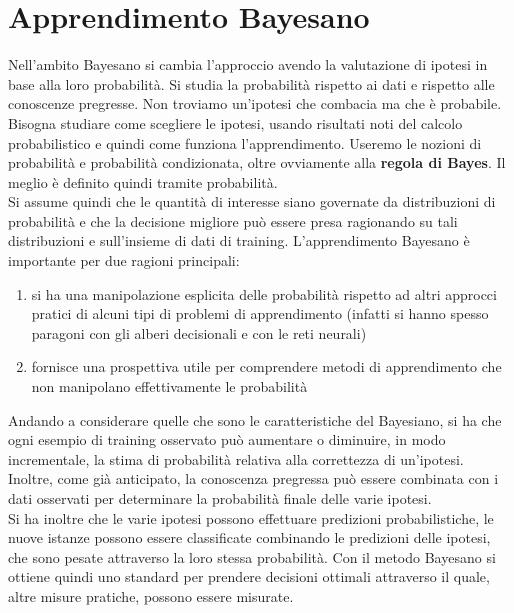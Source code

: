 \section{Apprendimento Bayesano}
Nell'ambito Bayesano si cambia l'approccio avendo la valutazione di ipotesi in base alla loro probabilità. Si studia la probabilità rispetto ai dati e rispetto
alle conoscenze pregresse. Non troviamo un'ipotesi che combacia ma che è probabile.\\

Bisogna studiare come scegliere le ipotesi, usando risultati noti del calcolo probabilistico e quindi come funziona l'apprendimento. Useremo le nozioni di probabilità e probabilità condizionata, oltre ovviamente alla \textbf{regola di Bayes}. Il meglio è definito quindi tramite probabilità.\\ 

Si assume quindi che le quantità di interesse siano governate da distribuzioni di probabilità e che la decisione migliore può essere presa ragionando su tali distribuzioni e sull'insieme di dati di training. L'apprendimento Bayesano è importante per due ragioni principali: 
\begin{enumerate}
  \item si ha una manipolazione esplicita delle probabilità rispetto ad altri approcci pratici di alcuni tipi di problemi di apprendimento (infatti si hanno spesso paragoni con gli alberi decisionali e con le reti neurali)
  \item fornisce una prospettiva utile per comprendere metodi di apprendimento che non manipolano effettivamente le probabilità
\end{enumerate}

Andando a considerare quelle che sono le caratteristiche del Bayesiano, si ha che ogni esempio di training osservato può aumentare o diminuire, in modo incrementale, la stima di probabilità relativa alla correttezza di un'ipotesi. Inoltre, come già anticipato, la conoscenza pregressa può essere combinata con i dati osservati per determinare la probabilità finale delle varie ipotesi. \\

Si ha inoltre che le varie ipotesi possono effettuare predizioni probabilistiche, le nuove istanze possono essere classificate combinando le predizioni delle ipotesi, che sono pesate attraverso la loro stessa probabilità. Con il metodo Bayesano si ottiene quindi uno standard per prendere decisioni ottimali attraverso il quale, altre misure pratiche, possono essere misurate. \\

